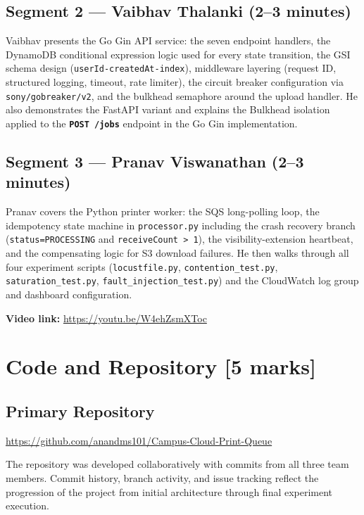 \documentclass[11pt,letterpaper]{article}
\newcommand{\code}[1]{\texttt{\small #1}}
\newcommand{\http}[1]{\textbf{\texttt{#1}}}
\begin{document}
\subsection{Segment 2 --- Vaibhav Thalanki (2--3 minutes)}
Vaibhav presents the Go Gin API service: the seven endpoint handlers, the DynamoDB conditional expression logic used for every state transition, the GSI schema design (\code{userId-createdAt-index}), middleware layering (request ID, structured logging, timeout, rate limiter), the circuit breaker configuration via \code{sony/gobreaker/v2}, and the bulkhead semaphore around the upload handler. He also demonstrates the FastAPI variant and explains the Bulkhead isolation applied to the \http{POST /jobs} endpoint in the Go Gin implementation.

\subsection{Segment 3 --- Pranav Viswanathan (2--3 minutes)}
Pranav covers the Python printer worker: the SQS long-polling loop, the idempotency state machine in \code{processor.py} including the crash recovery branch (\code{status=PROCESSING} and \code{receiveCount > 1}), the visibility-extension heartbeat, and the compensating logic for S3 download failures. He then walks through all four experiment scripts (\code{locustfile.py}, \code{contention\_test.py}, \code{saturation\_test.py}, \code{fault\_injection\_test.py}) and the CloudWatch log group and dashboard configuration.

\medskip
\begin{tcolorbox}[
  colback=surface,
  colframe=border,
  boxrule=0.6pt,
  arc=2pt,
  left=8pt, right=8pt, top=5pt, bottom=5pt,
]
  \textbf{Video link:} \url{https://youtu.be/W4ehZsmXToc}
\end{tcolorbox}


\section{Code and Repository [5 marks]}
\label{sec:code}

\subsection{Primary Repository}
\url{https://github.com/anandms101/Campus-Cloud-Print-Queue}

The repository was developed collaboratively with commits from all three team members. Commit history, branch activity, and issue tracking reflect the progression of the project from initial architecture through final experiment execution.
\end{document}
